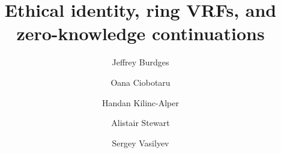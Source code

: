 \documentclass[letterpaper,twocolumn,10pt]{article}
\begin{document}
%

\date{}

\title{\Large \bf Ethical identity, ring VRFs, and zero-knowledge continuations}

\author{
	{\rm Jeffrey Burdges}\\
	\and
	{\rm Oana Ciobotaru}\\
	\and
	{\rm Handan Kilinc-Alper}\\
	\and
	{\rm Alistair Stewart}\\
	\and
    {\rm Sergey Vasilyev}\\
} %


\maketitle


\begin{abstract}

\end{abstract}





% 















% 







\appendix



\end{document}
